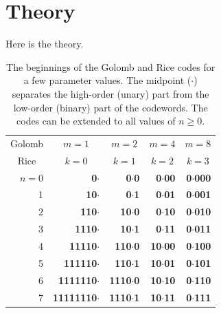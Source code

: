 \chapter{Theory}\label{ch:theory}
Here is the theory.

\begin{table}[]
\centering
\caption{The beginnings of the Golomb and Rice codes for a few parameter values. The midpoint ($\cdot$) separates the high-order (unary) part from the low-order (binary) part of the codewords. The codes can be extended to all values of $n\geq0$.}
\label{table:golomb-rice}
\begin{tabular}{rrrrr}
\multicolumn{1}{c}{Golomb}   & \multicolumn{1}{c}{$m=1$}   & \multicolumn{1}{c}{$m=2$}   & \multicolumn{1}{c}{$m=4$}   & \multicolumn{1}{c}{$m=8$}   \\
\multicolumn{1}{c}{Rice}     & \multicolumn{1}{c}{$k=0$}   & \multicolumn{1}{c}{$k=1$}   & \multicolumn{1}{c}{$k=2$}   & \multicolumn{1}{c}{$k=3$}   \\
\hline %
\multicolumn{1}{r|}{$n=0$}   & \textbf{0$\cdot$}           & \textbf{0$\cdot$0}          & \textbf{0$\cdot$00}         & \textbf{0$\cdot$000}        \\
\multicolumn{1}{r|}{      1} & \textbf{10$\cdot$}          & \textbf{0$\cdot$1}          & \textbf{0$\cdot$01}         & \textbf{0$\cdot$001}        \\
\multicolumn{1}{r|}{      2} & \textbf{110$\cdot$}         & \textbf{10$\cdot$0}         & \textbf{0$\cdot$10}         & \textbf{0$\cdot$010}        \\
\multicolumn{1}{r|}{      3} & \textbf{1110$\cdot$}        & \textbf{10$\cdot$1}         & \textbf{0$\cdot$11}         & \textbf{0$\cdot$011}        \\
\multicolumn{1}{r|}{      4} & \textbf{11110$\cdot$}       & \textbf{110$\cdot$0}        & \textbf{10$\cdot$00}        & \textbf{0$\cdot$100}        \\
\multicolumn{1}{r|}{      5} & \textbf{111110$\cdot$}      & \textbf{110$\cdot$1}        & \textbf{10$\cdot$01}        & \textbf{0$\cdot$101}        \\
\multicolumn{1}{r|}{      6} & \textbf{1111110$\cdot$}     & \textbf{1110$\cdot$0}       & \textbf{10$\cdot$10}        & \textbf{0$\cdot$110}        \\
\multicolumn{1}{r|}{      7} & \textbf{11111110$\cdot$}    & \textbf{1110$\cdot$1}       & \textbf{10$\cdot$11}        & \textbf{0$\cdot$111}        \\

\end{tabular}
\end{table}

